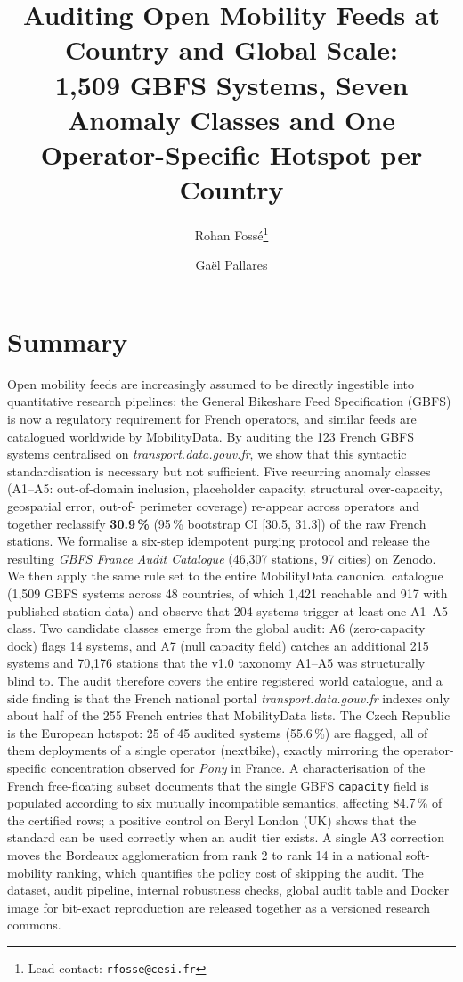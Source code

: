 \documentclass[11pt,a4paper]{article}
\title{\bfseries\sffamily\Large Auditing Open Mobility Feeds at Country and Global Scale:\\
1{,}509 GBFS Systems, Seven Anomaly Classes and One Operator-Specific Hotspot per Country}
\author[1]{Rohan Foss\'e\thanks{Lead contact: \texttt{rfosse@cesi.fr}}}
\author[2]{Ga\"el Pallares}
\affil[1]{CESI Engineering School, Montpellier, France}
\affil[2]{CESI LINEACT (EA 7527), Montpellier, France}
\date{}
\begin{document}
\maketitle

\section*{Summary}
Open mobility feeds are increasingly assumed to be directly ingestible
into quantitative research pipelines: the General Bikeshare Feed
Specification (GBFS) is now a regulatory requirement for French
operators, and similar feeds are catalogued worldwide by MobilityData.
By auditing the 123 French GBFS systems centralised on
\emph{transport.data.gouv.fr}, we show that this syntactic
standardisation is necessary but not sufficient. Five recurring
anomaly classes (A1--A5: out-of-domain inclusion, placeholder
capacity, structural over-capacity, geospatial error, out-of-
perimeter coverage) re-appear across operators and together
reclassify \textbf{30.9\,\%} (95\,\% bootstrap CI [30.5, 31.3]) of
the raw French stations. We formalise a six-step idempotent purging
protocol and release the resulting \emph{GBFS France Audit
Catalogue} (46{,}307 stations, 97 cities) on Zenodo. We then apply
the same rule set to the entire MobilityData canonical catalogue
(1{,}509 GBFS systems across 48 countries, of which 1{,}421
reachable and 917 with published station data) and observe that
204 systems trigger at least one A1--A5 class. Two candidate
classes emerge from the global audit: A6 (zero-capacity dock)
flags 14 systems, and A7 (null capacity field) catches an
additional 215 systems and 70{,}176 stations that the v1.0 taxonomy
A1--A5 was structurally blind to. The audit therefore covers the
entire registered world catalogue, and a side finding is that the
French national portal \emph{transport.data.gouv.fr} indexes only
about half of the 255 French entries that MobilityData lists. The Czech
Republic is the European hotspot: 25 of 45 audited systems
(55.6\,\%) are flagged, all of them deployments of a single
operator (nextbike), exactly mirroring the operator-specific
concentration observed for \emph{Pony} in France. A characterisation
of the French free-floating subset documents that the single GBFS
\texttt{capacity} field is populated according to six mutually
incompatible semantics, affecting 84.7\,\% of the certified rows; a
positive control on Beryl London (UK) shows that the standard can
be used correctly when an audit tier exists. A single A3 correction
moves the Bordeaux agglomeration from rank 2 to rank 14 in a
national soft-mobility ranking, which quantifies the policy cost of
skipping the audit. The dataset, audit pipeline, internal robustness
checks, global audit table and Docker image for bit-exact
reproduction are released together as a versioned research commons.
\end{document}
